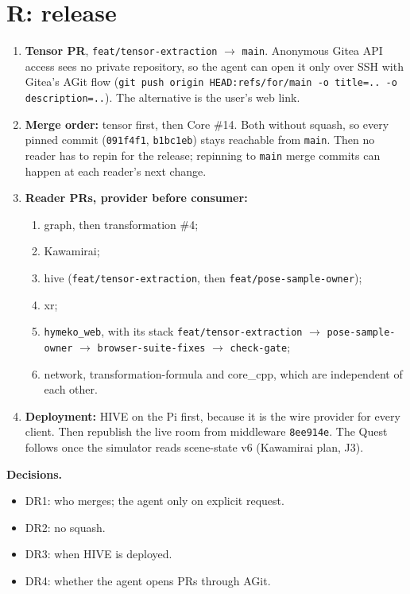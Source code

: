 \documentclass[11pt,a4paper]{article}
\newcommand{\code}[1]{\texttt{#1}}
\begin{document}
\section{R: release}
\begin{enumerate}[label=R\arabic*,nosep]
\item \textbf{Tensor PR}, \code{feat/tensor-extraction} $\to$ \code{main}. Anonymous Gitea API access sees
  no private repository, so the agent can open it only over SSH with Gitea's AGit flow
  (\code{git push origin HEAD:refs/for/main -o title=.. -o description=..}). The alternative is the
  user's web link.
\item \textbf{Merge order:} tensor first, then Core \#14. Both without squash, so every pinned commit
  (\code{091f4f1}, \code{b1bc1eb}) stays reachable from \code{main}. Then no reader has to repin for the
  release; repinning to \code{main} merge commits can happen at each reader's next change.
\item \textbf{Reader PRs, provider before consumer:}
  \begin{enumerate}[nosep]
  \item graph, then transformation \#4;
  \item Kawamirai;
  \item hive (\code{feat/tensor-extraction}, then \code{feat/pose-sample-owner});
  \item xr;
  \item \code{hymeko\_web}, with its stack \code{feat/tensor-extraction} $\to$ \code{pose-sample-owner} $\to$
    \code{browser-suite-fixes} $\to$ \code{check-gate};
  \item network, transformation-formula and core\_cpp, which are independent of each other.
  \end{enumerate}
\item \textbf{Deployment:} HIVE on the Pi first, because it is the wire provider for every client. Then
  republish the live room from middleware \code{8ee914e}. The Quest follows once the simulator reads
  scene-state v6 (Kawamirai plan, J3).
\end{enumerate}
\textbf{Decisions.}
\begin{itemize}[nosep]
\item DR1: who merges; the agent only on explicit request.
\item DR2: no squash.
\item DR3: when HIVE is deployed.
\item DR4: whether the agent opens PRs through AGit.
\end{itemize}
\end{document}
